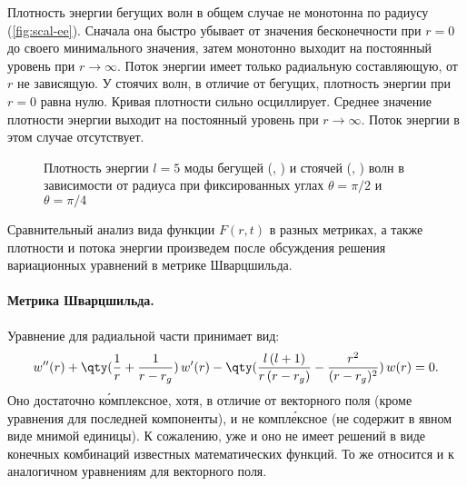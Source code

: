 \documentclass[\docroot/reports/draft/report.tex]{subfiles}
\begin{document}
        Плотность энергии бегущих волн в общем случае не монотонна по радиусу (\autoref{fig:scal-ee}). Сначала она быстро убывает от значения бесконечности при $r = 0$ до своего минимального значения, затем монотонно выходит на постоянный уровень при $r \to \infty$. Поток энергии имеет только радиальную составляющую, от $r$ не зависящую. У стоячих волн, в отличие от бегущих, плотность энергии при $r = 0$ равна нулю. Кривая плотности сильно осциллирует. Среднее значение плотности энергии выходит на постоянный уровень при $r \to \infty$. Поток энергии в этом случае отсутствует.
        \begin{figure}[h]
            \centering
            \hspace{8pt}%
            \hspace{8pt}%
            \hspace{8pt}%
            \hspace{8pt}%
            \caption[]{Плотность энергии $l=5$ моды бегущей (, ) и стоячей (, ) волн в зависимости от радиуса при фиксированных углах $\theta = \pi/2$ и $\theta = \pi/4$}%
            \label{fig:scal-ee}%
        \end{figure}

        Сравнительный анализ вида функции $F(r,t)$ в разных метриках, а также плотности и потока энергии произведем после обсуждения решения вариационных уравнений в метрике Шварцшильда.

    \paragraph{Метрика Шварцшильда.}

        Уравнение для радиальной части принимает вид:
        \begin{gather}\label{eq:scal-sw-eq}
            w''(r) + \qty(\frac{1}{r} + \frac{1}{r - r_g})\, w'(r) - \qty(\frac{l\,(l+1)}{r\, (r-r_g)} - \frac{r^2}{(r-r_g)^2})\, w(r) = 0.
        \end{gather}
        Оно достаточно к\'{о}мплексное, хотя, в отличие от векторного поля (кроме уравнения для последней компоненты), и не компл\'{е}ксное (не содержит в явном виде мнимой единицы). К сожалению, уже и оно не имеет решений в виде конечных комбинаций известных математических функций. То же относится и к аналогичном уравнениям для векторного поля.
\end{document}

